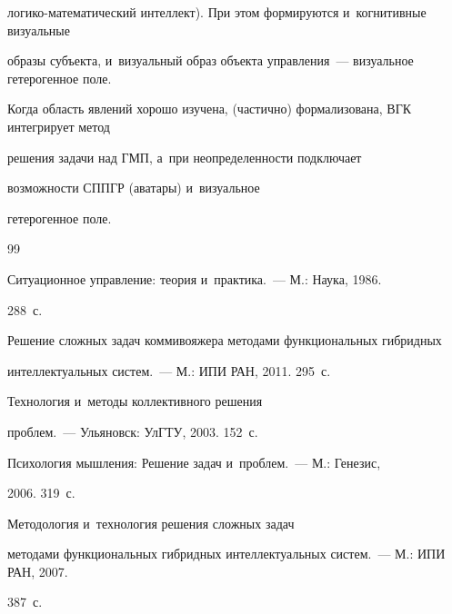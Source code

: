ло\-ги\-ко-ма\-те\-ма\-ти\-че\-ский интеллект). При этом формируются и~когнитивные визуальные 


образы субъекта, и~визуальный образ объекта управ\-ле\-ния~--- визуальное гетерогенное поле. 


Когда область явлений хорошо изучена, (частично) формализована, ВГК интегрирует метод 


решения задачи над ГМП, а~при неопределенности подключает 


возможности СППГР (аватары) и~визуальное 


гетерогенное поле.





{\small\frenchspacing


{%




\begin{thebibliography}{99}




 Ситуационное управ\-ле\-ние: теория и~практика.~--- М.: Наука, 1986. 


288~с.






Решение сложных задач коммивояжера методами функциональных гибридных 


интеллектуальных систем.~--- М.: ИПИ РАН, 2011. 295~с.




 Технология и~методы коллективного решения 


проблем.~--- Ульяновск: УлГТУ, 2003. 152~с.




 Психология мышления: Решение задач и~проблем.~--- М.: Генезис, 


2006. 319~с.




 Методология и~технология решения сложных задач 


методами функциональных гибридных интеллектуальных систем.~--- М.: ИПИ РАН, 2007. 


387~с.





\end{thebibliography}}}
